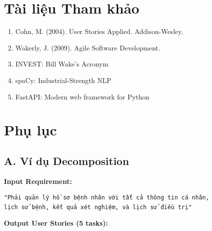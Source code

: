 \documentclass[12pt,a4paper]{article}
\begin{document}
\section{Tài liệu Tham khảo}

\begin{enumerate}
    \item Cohn, M. (2004). User Stories Applied. Addison-Wesley.
    \item Wakerly, J. (2009). Agile Software Development. 
    \item INVEST: Bill Wake's Acronym
    \item spaCy: Industrial-Strength NLP
    \item FastAPI: Modern web framework for Python
\end{enumerate}

\section{Phụ lục}

\subsection{A. Ví dụ Decomposition}

\textbf{Input Requirement:}
\begin{verbatim}
"Phải quản lý hồ sơ bệnh nhân với tất cả thông tin cá nhân, 
lịch sử bệnh, kết quả xét nghiệm, và lịch sử điều trị"
\end{verbatim}

\textbf{Output User Stories (5 tasks):}
\end{document}
